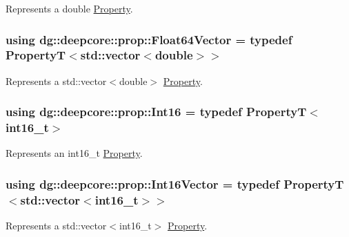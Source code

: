 Represents a {\ttfamily double} \hyperlink{classdg_1_1deepcore_1_1_property}{Property}. 

\subsubsection[{\texorpdfstring{Float64\+Vector}{Float64Vector}}]{\setlength{\rightskip}{0pt plus 5cm}using {\bf dg\+::deepcore\+::prop\+::\+Float64\+Vector} = typedef PropertyT$<$std\+::vector$<$double$>$$>$}\hypertarget{group___process_properties_gae54c4277af43197673595ecb00b940d6}{}\label{group___process_properties_gae54c4277af43197673595ecb00b940d6}


Represents a {\ttfamily std\+::vector$<$double$>$} \hyperlink{classdg_1_1deepcore_1_1_property}{Property}. 

\subsubsection[{\texorpdfstring{Int16}{Int16}}]{\setlength{\rightskip}{0pt plus 5cm}using {\bf dg\+::deepcore\+::prop\+::\+Int16} = typedef PropertyT$<$int16\+\_\+t$>$}\hypertarget{group___process_properties_ga1dc9580e4c353c4fbe9f0b5908bc474a}{}\label{group___process_properties_ga1dc9580e4c353c4fbe9f0b5908bc474a}


Represents an {\ttfamily int16\+\_\+t} \hyperlink{classdg_1_1deepcore_1_1_property}{Property}. 

\subsubsection[{\texorpdfstring{Int16\+Vector}{Int16Vector}}]{\setlength{\rightskip}{0pt plus 5cm}using {\bf dg\+::deepcore\+::prop\+::\+Int16\+Vector} = typedef PropertyT$<$std\+::vector$<$int16\+\_\+t$>$$>$}\hypertarget{group___process_properties_gaa9edeb8c24adefc69d465f4b95b2ad77}{}\label{group___process_properties_gaa9edeb8c24adefc69d465f4b95b2ad77}


Represents a {\ttfamily std\+::vector$<$int16\+\_\+t$>$} \hyperlink{classdg_1_1deepcore_1_1_property}{Property}. 

